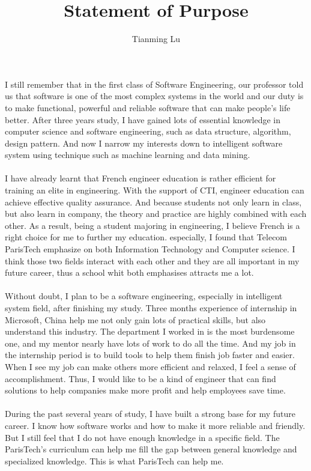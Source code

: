 \documentclass{article}
\title{Statement of Purpose}
\author{Tianming Lu}
\begin{document}
\maketitle
\paragraph{}
I still remember that in the first class of Software Engineering, our professor told us that software is one of the most complex systems in the world and our duty is to make functional, powerful and reliable software that can make people's life better. After three years study, I have gained lots of essential knowledge in computer science and software engineering, such as data structure, algorithm, design pattern. And now I narrow my interests down to intelligent software system using technique such as machine learning and data mining.
\paragraph{}
I have already learnt that French engineer education is rather efficient for training an elite in engineering. With the support of CTI, engineer education can achieve effective quality assurance. And because students not only learn in class, but also learn in company, the theory and practice are highly combined with each other. As a result, being a student majoring in engineering, I believe French is a right choice for me to further my education. especially, I found that Telecom ParisTech emphasize on both Information Technology and Computer science. I think those two fields interact with each other and they are all important in my future career, thus a school whit both emphasises attracts me a lot. 
\paragraph{}
Without doubt, I plan to be a software engineering, especially in intelligent system field, after finishing my study. Three months experience of internship in Microsoft, China help me not only gain lots of practical skills, but also understand this industry. The department I worked in is the most burdensome one, and my mentor nearly have lots of work to do all the time. And my job in the internship period is to build tools to help them finish job faster and easier. When I see my job can make others more efficient and relaxed, I feel a sense of accomplishment. Thus, I would like to be a kind of engineer that can find solutions to help companies make more profit and help employees save time.
\paragraph{}   
During the past several years of study, I have built a strong base for my future career. I know how software works and how to make it more reliable and friendly. But I still feel that I do not have enough knowledge in a specific field. The ParisTech's curriculum can help me fill the gap between general knowledge and specialized knowledge. This is what ParisTech can help me.
\end{document}
